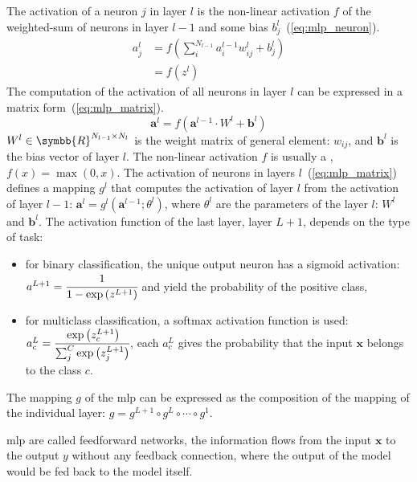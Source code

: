 \documentclass[../main.tex]{subfiles}
\begin{document}
     The activation of a neuron \(j\) in layer \(l\) is the non-linear activation \(f\) of the weighted-sum of neurons in layer \(l-1\) and some bias \(b_{j}^{l}\)~(\cref{eq:mlp_neuron}).
     \begin{align}
         a_{j}^{l} & = f\left(\sum_{i}^{N_{l-1}}a_{i}^{l-1}w_{ij}^{l} + b_{j}^{l} \right) \\ \label{eq:mlp_neuron}
                   & = f\left(z^{l}\right)
     \end{align}
     The computation of the activation of all neurons in layer \(l\) can be expressed in a matrix form~(\cref{eq:mlp_matrix}).
     \begin{equation}
         \symbf{a}^{l} = f\left( \symbf{a}^{l-1} \cdot W^l + \symbf{b}^{l} \right) \label{eq:mlp_matrix}
     \end{equation}
     \(W^l \in \symbb{R}^{N_{l-1} \times N_{l}}\) is the weight matrix of general element: \(w_{ij}\), and \(\symbf{b}^{l}\) is the bias vector of layer \(l\).
     The non-linear activation \(f\) is usually a , \(f\left(x\right) = \max\left(0, x\right)\).
     The activation of neurons in layers \(l\)~(\cref{eq:mlp_matrix}) defines a mapping \(g^{l}\) that computes the activation of layer \(l\) from the activation of layer \(l-1\): \( \symbf{a}^{l} = g^{l}\left(\symbf{a}^{l-1}; \theta^{l}\right)\), where \(\theta^{l}\) are the parameters of the layer \(l\): \(W^l\) and \( \symbf{b}^{l}\).
     The activation function of the last layer, layer \(L+1\), depends on the type of task:
     \begin{itemize}
         \item for binary classification, the unique output neuron has a sigmoid activation: \(a^{L+1} = \cfrac{1}{1-\exp\left(z^{L+1}\right)}\) and  yield the probability of the positive class,
         \item for multiclass classification, a softmax activation function is used: \(a_{c}^{L} = \cfrac{\exp\left(z_{c}^{L+1}\right)}{\sum_{j}^{C}\exp\left(z_{j}^{L+1}\right)}\), each \(a_{c}^{L}\) gives the probability that the input \(\symbf{x}\) belongs to the class \(c\).
     \end{itemize}
     The mapping \(g\) of the \gls{mlp} can be expressed as the composition of the mapping of the individual layer: \(g = g^{L+1} \circ g^{L} \circ \cdots \circ g^{1}\).

     \Gls{mlp} are called feedforward networks, the information flows from the input \(\symbf{x}\) to the output \(y\) without any feedback connection, where the output of the model would be fed back to the model itself.
\end{document}
